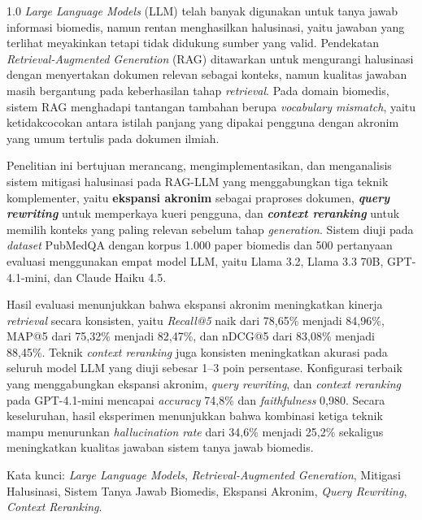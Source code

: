 \begin{spacing}{1.0}
\textit{Large Language Models} (LLM) telah banyak digunakan untuk tanya jawab informasi biomedis, namun rentan menghasilkan halusinasi, yaitu jawaban yang terlihat meyakinkan tetapi tidak didukung sumber yang valid. Pendekatan \textit{Retrieval-Augmented Generation} (RAG) ditawarkan untuk mengurangi halusinasi dengan menyertakan dokumen relevan sebagai konteks, namun kualitas jawaban masih bergantung pada keberhasilan tahap \textit{retrieval}. Pada domain biomedis, sistem RAG menghadapi tantangan tambahan berupa \textit{vocabulary mismatch}, yaitu ketidakcocokan antara istilah panjang yang dipakai pengguna dengan akronim yang umum tertulis pada dokumen ilmiah.

Penelitian ini bertujuan merancang, mengimplementasikan, dan menganalisis sistem mitigasi halusinasi pada RAG-LLM yang menggabungkan tiga teknik komplementer, yaitu \textbf{ekspansi akronim} sebagai praproses dokumen, \textbf{\textit{query rewriting}} untuk memperkaya kueri pengguna, dan \textbf{\textit{context reranking}} untuk memilih konteks yang paling relevan sebelum tahap \textit{generation}. Sistem diuji pada \textit{dataset} PubMedQA dengan korpus 1.000 paper biomedis dan 500 pertanyaan evaluasi menggunakan empat model LLM, yaitu Llama 3.2, Llama 3.3 70B, GPT-4.1-mini, dan Claude Haiku 4.5.

Hasil evaluasi menunjukkan bahwa ekspansi akronim meningkatkan kinerja \textit{retrieval} secara konsisten, yaitu \textit{Recall@5} naik dari 78,65\% menjadi 84,96\%, MAP@5 dari 75,32\% menjadi 82,47\%, dan nDCG@5 dari 83,08\% menjadi 88,45\%. Teknik \textit{context reranking} juga konsisten meningkatkan akurasi pada seluruh model LLM yang diuji sebesar 1--3 poin persentase. Konfigurasi terbaik yang menggabungkan ekspansi akronim, \textit{query rewriting}, dan \textit{context reranking} pada GPT-4.1-mini mencapai \textit{accuracy} 74,8\% dan \textit{faithfulness} 0,980. Secara keseluruhan, hasil eksperimen menunjukkan bahwa kombinasi ketiga teknik mampu menurunkan \textit{hallucination rate} dari 34,6\% menjadi 25,2\% sekaligus meningkatkan kualitas jawaban sistem tanya jawab biomedis.

Kata kunci: \textit{Large Language Models}, \textit{Retrieval-Augmented Generation}, Mitigasi Halusinasi, Sistem Tanya Jawab Biomedis, Ekspansi Akronim, \textit{Query Rewriting}, \textit{Context Reranking}.
\end{spacing}
